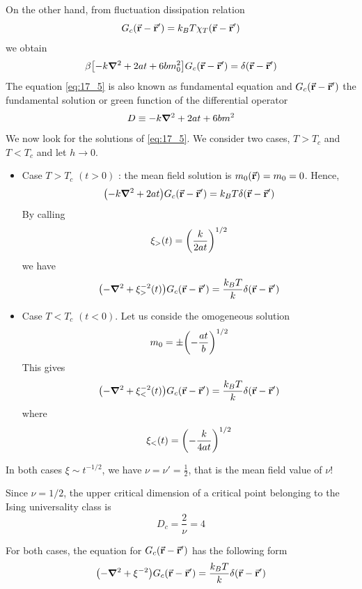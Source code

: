 \documentclass[../main/main.tex]{subfiles}
\begin{document}
On the other hand, from fluctuation dissipation relation
\begin{equation}
  G_c (\va{r}-\va{r}') = k_B T \chi _T (\va{r}-\va{r}')
\end{equation}
we obtain
\begin{equation}
  \beta \qty[-k \grad ^2 + 2 a t + 6 b m_0 ^2 ] G_c (\va{r}-\va{r}') = \delta (\va{r}- \va{r}')
  \label{eq:17_5}
\end{equation}
The equation \eqref{eq:17_5} is also known as fundamental equation and \( G_c (\va{r}- \va{r}') \)  the fundamental solution or green function of the differential operator
\begin{equation}
  D \equiv - k \grad ^2 + 2 a t + 6 b m^2
\end{equation}
We now look for the solutions of \eqref{eq:17_5}.  We consider two cases, \( T > T_c \) and \( T < T_c \) and let \( h \rightarrow 0 \).
\begin{itemize}
\item Case \( T > T_c \) \( (t>0) \) : the mean field solution is \( m_0 (\va{r}) = m_0 = 0 \). Hence,
\begin{equation}
  \qty(-k \grad ^2 + 2 a t ) G_c (\va{r}-\va{r}') = k_B T \delta (\va{r}-\va{r}')
  \label{eq:17_6}
\end{equation}
By calling
\begin{equation}
  \xi_> (t) = \qty(\frac{k}{2 a t })^{1/2}
\end{equation}
we have
\begin{equation}
  \qty(-\grad ^2 + \xi _> ^{-2} (t)) G_c (\va{r}-\va{r}') = \frac{k_B T}{k} \delta (\va{r}-\va{r}')
\end{equation}
\item Case \( T < T_c \) \( (t<0) \). Let us conside the omogeneous solution
\begin{equation}
  m_0 = \pm \qty(-\frac{at}{b})^{1/2}
\end{equation}
This gives
\begin{equation}
  \qty(-\grad ^2 + \xi _<^{-2} (t))G_c (\va{r}- \va{r}') = \frac{k_B T}{k} \delta (\va{r}- \va{r}')
\end{equation}
where
\begin{equation}
  \xi _{<} (t) = \qty(- \frac{k}{4at})^{1/2}
\end{equation}
\end{itemize}
\begin{remark}
In both cases \( \xi \sim t^{-1/2} \), we have \( \nu = \nu ' = \frac{1}{2} \), that is the mean field value of \( \nu  \)!
\end{remark}
\begin{remark}
Since \( \nu = 1/2 \), the upper critical dimension of a critical point belonging to the Ising universality class is
\begin{equation}
  D_c = \frac{2}{\nu } = 4
\end{equation}
\end{remark}
For both cases, the equation for \( G_c (\va{r}-\va{r}') \) has the following form
\begin{equation}
  \qty(- \grad ^2 + \xi ^{-2}) G_c (\va{r}-\va{r}') = \frac{k_B T}{k} \delta (\va{r}-\va{r}')
\end{equation}
\end{document}
